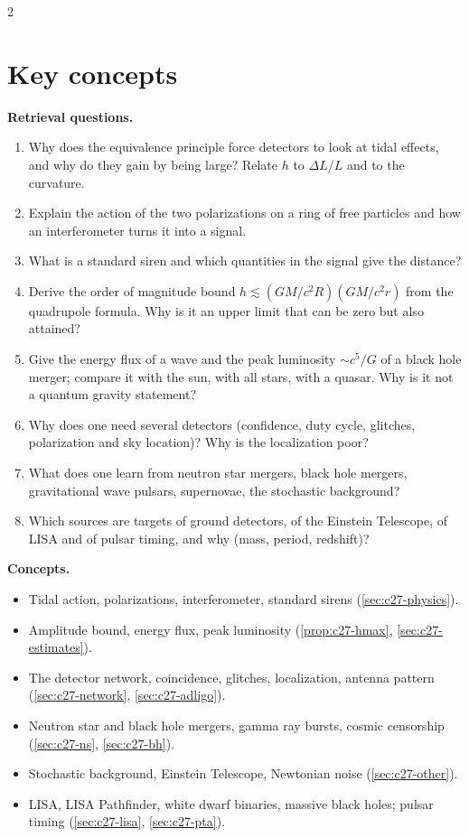 \begin{paracol}{2}
\section*{Key concepts}
\begin{keyconcepts}
\textbf{Retrieval questions.}
\begin{enumerate}
  \item Why does the equivalence principle force detectors to look at tidal effects, and why do they gain by being large? Relate $h$ to $\Delta L/L$ and to the curvature.
  \item Explain the action of the two polarizations on a ring of free particles and how an interferometer turns it into a signal.
  \item What is a standard siren and which quantities in the signal give the distance?
  \item Derive the order of magnitude bound $h\lesssim(GM/c^2R)(GM/c^2r)$ from the quadrupole formula. Why is it an upper limit that can be zero but also attained?
  \item Give the energy flux of a wave and the peak luminosity $\sim c^5/G$ of a black hole merger; compare it with the sun, with all stars, with a quasar. Why is it not a quantum gravity statement?
  \item Why does one need several detectors (confidence, duty cycle, glitches, polarization and sky location)? Why is the localization poor?
  \item What does one learn from neutron star mergers, black hole mergers, gravitational wave pulsars, supernovae, the stochastic background?
  \item Which sources are targets of ground detectors, of the Einstein Telescope, of LISA and of pulsar timing, and why (mass, period, redshift)?
\end{enumerate}
\textbf{Concepts.}
\begin{itemize}
  \item Tidal action, polarizations, interferometer, standard sirens (\cref{sec:c27-physics}).
  \item Amplitude bound, energy flux, peak luminosity (\cref{prop:c27-hmax}, \cref{sec:c27-estimates}).
  \item The detector network, coincidence, glitches, localization, antenna pattern (\cref{sec:c27-network}, \cref{sec:c27-adligo}).
  \item Neutron star and black hole mergers, gamma ray bursts, cosmic censorship (\cref{sec:c27-ns}, \cref{sec:c27-bh}).
  \item Stochastic background, Einstein Telescope, Newtonian noise (\cref{sec:c27-other}).
  \item LISA, LISA Pathfinder, white dwarf binaries, massive black holes; pulsar timing (\cref{sec:c27-lisa}, \cref{sec:c27-pta}).
\end{itemize}
\end{keyconcepts}

\flushside
\end{paracol}
